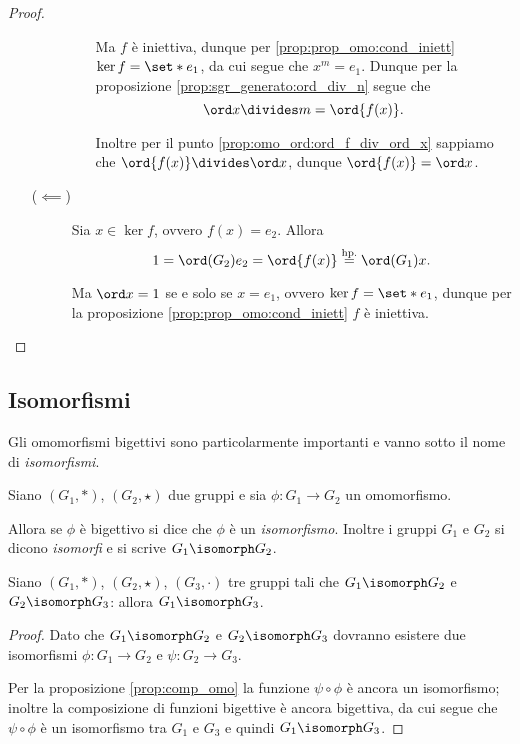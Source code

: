 \begin{proof}
\begin{enumerate}[label={(\roman*)}]
\begin{description}
\begin{itemize}
                Ma $f$ è iniettiva, dunque per \ref{prop:prop_omo:cond_iniett} $\ker f = \set*{e_1}$, da cui segue che $x^m = e_1$. 
                Dunque per la proposizione \ref{prop:sgr_generato:ord_div_n} segue che \[
                    \ord x \divides m = \ord{f(x)}.    
                \]

                Inoltre per il punto \ref{prop:omo_ord:ord_f_div_ord_x} sappiamo che $\ord{f(x)} \divides \ord x$, dunque $\ord{f(x)} = \ord x$.
            \end{itemize} 
            \item[($\impliedby$)] Sia $x \in \ker f$, ovvero $f(x) = e_2$. Allora \[
                1 = \ord(G_2){e_2} = \ord{f(x)} \stackrel{\text{hp.}}{=} \ord(G_1){x}.
            \] 
            
            Ma $\ord x = 1$ se e solo se $x = e_1$, ovvero $\ker f = \set*{e_1}$, dunque per la proposizione \ref{prop:prop_omo:cond_iniett} $f$ è iniettiva.
        \end{description}
    \end{enumerate}
\end{proof}

\subsection{Isomorfismi}

Gli omomorfismi bigettivi sono particolarmente importanti e vanno sotto il nome di \emph{isomorfismi}.

\begin{definition}
    [Isomorfismo] \label{def:isomorfismo}
    Siano $(G_1, *)$, $(G_2, \star)$ due gruppi e sia $\phi : G_1 \to G_2$ un omomorfismo.

    Allora se $\phi$ è bigettivo si dice che $\phi$ è un \emph{isomorfismo}. Inoltre i gruppi $G_1$ e $G_2$ si dicono \emph{isomorfi} e si scrive $G_1 \isomorph G_2$.
\end{definition}

\begin{corollary}\label{prop:trans_isomorf}
    Siano $(G_1, *)$, $(G_2, \star)$, $(G_3, \cdot)$ tre gruppi tali che $G_1 \isomorph G_2$ e $G_2 \isomorph G_3$: allora $G_1 \isomorph G_3$.
\end{corollary}
\begin{proof}
    Dato che $G_1 \isomorph G_2$ e $G_2 \isomorph G_3$ dovranno esistere due isomorfismi $\phi : G_1 \to G_2$ e $\psi : G_2 \to G_3$.

    Per la proposizione \ref{prop:comp_omo} la funzione $\psi \circ \phi$ è ancora un isomorfismo; inoltre la composizione di funzioni bigettive è ancora bigettiva, da cui segue che $\psi \circ \phi$ è un isomorfismo tra $G_1$ e $G_3$ e quindi $G_1 \isomorph G_3$.
\end{proof}

